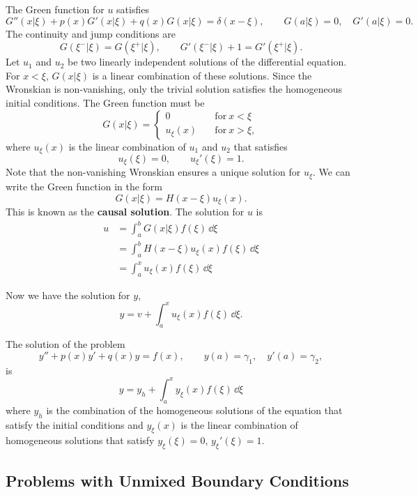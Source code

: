 The Green function for $u$ satisfies
\[
G''(x|\xi) + p(x) G'(x|\xi) + q(x) G(x|\xi) = \delta(x-\xi), \qquad
G(a|\xi) = 0, \quad G'(a|\xi) = 0.
\]
The continuity and jump conditions are
\[
G(\xi^-|\xi) = G(\xi^+|\xi), \qquad G'(\xi^-|\xi) + 1 = G'(\xi^+|\xi).
\]
Let $u_1$ and $u_2$ be two linearly independent solutions of the 
differential equation.  For $x<\xi$, $G(x|\xi)$ is a linear combination 
of these solutions.  Since the Wronskian is non-vanishing, only the
trivial solution satisfies the homogeneous initial conditions.  The Green
function must be
\[
G(x|\xi) = 
\begin{cases}
  0 \quad &\mathrm{for}\ x < \xi \\
  u_\xi(x) \quad &\mathrm{for}\ x > \xi,
\end{cases}
\]
where $u_\xi(x)$ is the linear combination of $u_1$ and $u_2$ that satisfies
\[
u_\xi(\xi) = 0, \qquad u_\xi'(\xi) = 1.
\]
Note that the non-vanishing Wronskian ensures a unique solution for $u_\xi$.
We can write the Green function in the form
\[
G(x|\xi) = H(x-\xi) u_\xi(x).
\]
This is known as the \textbf{causal solution}.
The solution for $u$ is
\begin{align*}
  u       &= \int_a^b G(x|\xi) f(\xi) \,\dd \xi \\
  &= \int_a^b H(x-\xi) u_\xi(x) f(\xi) \,\dd \xi \\
  &= \int_a^x u_\xi(x) f(\xi) \,\dd \xi 
\end{align*}

Now we have the solution for $y$,
\[
y = v + \int_a^x u_\xi(x) f(\xi) \,\dd \xi.
\]



\begin{Result}
  The solution of the problem
  \[
  y'' + p(x) y' + q(x) y = f(x), \qquad y(a) = \gamma_1, \quad y'(a) = \gamma_2,
  \]
  is
  \[
  y = y_h + \int_a^x y_\xi(x) f(\xi) \,\dd \xi
  \]
  where $y_h$ is the combination of the homogeneous solutions of the equation 
  that satisfy the initial conditions and $y_\xi(x)$ is the linear combination
  of homogeneous solutions that satisfy $y_\xi(\xi) = 0$,
  $y_\xi'(\xi) = 1$.
\end{Result}










\subsection{Problems with Unmixed Boundary Conditions}

